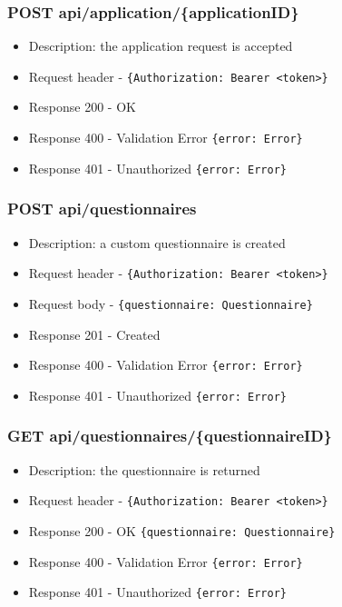 \subsubsection{POST api/application/\{applicationID\}}
\begin{itemize}
    \item Description: the application request is accepted
    \item Request header - \verb|{Authorization: Bearer <token>}|
    \item Response 200 - OK
    \item Response 400 - Validation Error \verb|{error: Error}|
    \item Response 401 - Unauthorized \verb|{error: Error}|
\end{itemize}

\subsubsection{POST api/questionnaires}
\begin{itemize}
    \item Description: a custom questionnaire is created
    \item Request header - \verb|{Authorization: Bearer <token>}|
    \item Request body - \verb|{questionnaire: Questionnaire}|
    \item Response 201 - Created
    \item Response 400 - Validation Error \verb|{error: Error}|
    \item Response 401 - Unauthorized \verb|{error: Error}|
\end{itemize}

\subsubsection{GET api/questionnaires/\{questionnaireID\}}
\begin{itemize}
    \item Description: the questionnaire is returned
    \item Request header - \verb|{Authorization: Bearer <token>}|
    \item Response 200 - OK \verb|{questionnaire: Questionnaire}|
    \item Response 400 - Validation Error \verb|{error: Error}|
    \item Response 401 - Unauthorized \verb|{error: Error}|
\end{itemize}

